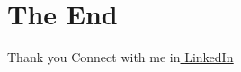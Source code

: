 \documentclass[compress,brown]{beamer}
\begin{document}
\section{The End}
	\begin{frame}{Thank you}
	\vspace{-0.3cm}	
	\center 
	Connect with me in\href{https://www.linkedin.com/in/vitali-avagyan-a1566234/}{ \underline{LinkedIn}}  
	
	
\end{frame}
\end{document}
